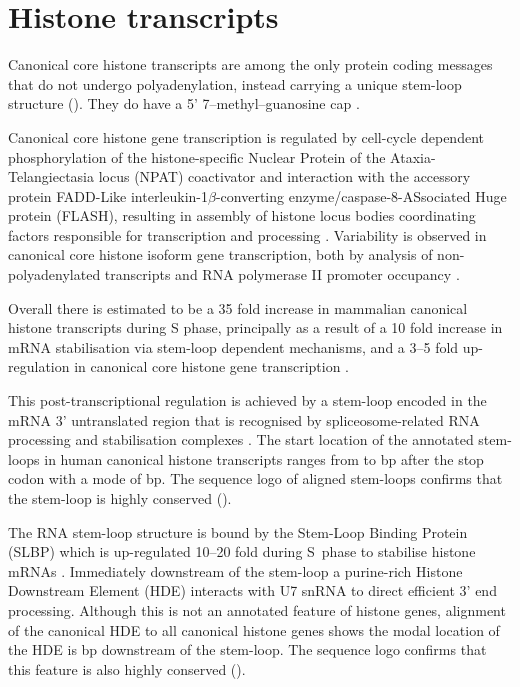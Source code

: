 \section{Histone transcripts}

  Canonical core histone transcripts are among the only protein coding messages
  that do not undergo polyadenylation,
  instead carrying a unique stem-loop structure ().
  They do have a 5' 7--methyl--guanosine cap \citep{MarzluffNatRevGen2008}.

  Canonical core histone gene transcription is regulated
  by cell-cycle dependent phosphorylation of the histone-specific
  Nuclear Protein of the Ataxia-Telangiectasia locus (NPAT) coactivator
  and interaction with the accessory protein
  FADD-Like interleukin-1$\beta$-converting enzyme/caspase-8-ASsociated Huge protein (FLASH),
  resulting in assembly of histone locus bodies
  coordinating factors responsible for transcription and processing
  \citep{MarzluffNatRevGen2008,RattrayMueller2012,Hoefig2014}.
  Variability is observed in canonical core histone isoform gene transcription,
  both by analysis of non-polyadenylated transcripts \citep{YangGenomeBiol2011}
  and RNA polymerase II promoter occupancy \citep{Ederveen2011}.

  Overall there is estimated to be a 35 fold increase in mammalian
  canonical histone transcripts during S phase,
  principally as a result of a 10 fold increase in mRNA stabilisation
  via stem-loop dependent mechanisms,
  and a 3--5 fold up-regulation in canonical core histone gene transcription \citep{HarrisMCB1991}.

  This post-transcriptional regulation is achieved by
  a stem-loop encoded in the mRNA 3' untranslated region
  that is recognised by spliceosome-related RNA
  processing and stabilisation complexes \citep{stem-loop-structure}.
  The start location of the annotated stem-loops in human canonical histone transcripts
  ranges from \StemLoopStartMin{} to \StemLoopStartMax{} bp after the stop codon
  with a mode of \StemLoopStartMode{} bp.
  The sequence logo of aligned stem-loops confirms that the stem-loop is
  highly conserved ().

  The RNA stem-loop structure is bound by the Stem-Loop Binding Protein (SLBP)
  which is up-regulated 10--20 fold during S~phase to stabilise
  histone mRNAs \citep{SLBP-regulation}.
  Immediately downstream of the stem-loop a purine-rich Histone Downstream Element (HDE)
  interacts with U7 snRNA to direct efficient 3' end processing.
  Although this is not an annotated feature of histone genes,
  alignment of the canonical HDE \citep{HDE-sequence} to all canonical histone genes
  shows the modal location of the HDE is
  \HDEsDistanceFromStemLoopMode{} bp downstream of the stem-loop.
  The sequence logo confirms that this feature is also highly conserved ().

